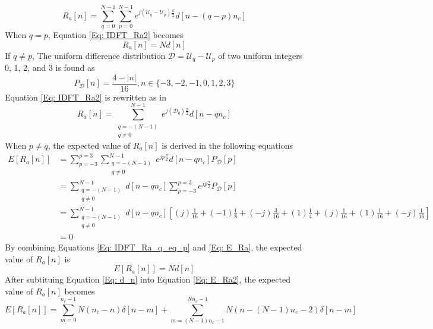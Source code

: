 \documentclass[draftcls,onecolumn]{IEEEtran}  %
\begin{document}
\begin{equation}\label{Eq: IDFT_Ra2}
R_a[n] = \sum\limits_{q=0}^{N-1} \sum\limits_{p=0}^{N-1} 
e^{j(\mathcal{U}_q-\mathcal{U}_p)\frac{\pi}{2}} d[n-(q-p)n_c]
\end{equation}
When $q = p$, Equation \ref{Eq: IDFT_Ra2} becomes
\begin{equation}\label{Eq: IDFT_Ra_q_eq_p}
R_a[n] = N d[n]
\end{equation}
If $q \neq p$, The uniform difference distribution $\mathcal{D} = \mathcal{U}_q-\mathcal{U}_p$ of two uniform integers 0, 1, 2, and 3 is found as 
\begin{equation}\label{Eq: diff_uni}
P_{\mathcal{D}}[n] = \frac{4-|n|}{16}, n \in \{ -3,-2,-1,0,1,2,3 \} 
\end{equation}
Equation \ref{Eq: IDFT_Ra2} is rewritten as in
\begin{equation}\label{Eq: IDFT_Ra3}
R_a[n] = \sum\limits_{\substack{q=-(N-1) \\ q\neq 0}}^{N-1} e^{j(\mathcal{D}_q)\frac{\pi}{2}} d[n-q n_c]
\end{equation}
When $p \neq q $, the expected value of $R_a[n]$ is derived in the following equations
\begin{equation}\label{Eq: E_Ra}
\begin{split}
E[R_a[n]] &= \sum\limits_{p=-3}^{p=3} \sum\limits_{\substack{q=-(N-1) \\ q\neq 0}}^{N-1}  e^{j p\frac{\pi}{2}} d[n-q n_c] P_{\mathcal{D}}[p] \\
          &= \sum\limits_{\substack{q=-(N-1) \\ q\neq 0}}^{N-1} d[n-q n_c]  \sum\limits_{p=-3}^{p=3} e^{j p\frac{\pi}{2}}  P_{\mathcal{D}}[p] \\
          &= \sum\limits_{\substack{q=-(N-1) \\ q\neq 0}}^{N-1} d[n-q n_c] [(j) \frac{1}{16} + (-1) \frac{1}{8} + (-j) \frac{3}{16} + (1) \frac{1}{4} + (j) \frac{1}{16} + (1) \frac{1}{16} + (-j) \frac{1}{16}] \\
          &= 0
\end{split}
\end{equation}
By combining Equations \ref{Eq: IDFT_Ra_q_eq_p} and \ref{Eq: E_Ra}, the expected value of $R_a[n]$ is
\begin{equation}\label{Eq: E_Ra2}
E[R_a[n]] = N d[n]
\end{equation}
After subtituing Equation \ref{Eq: d_n} into Equation \ref{Eq: E_Ra2}, the expected value of $R_a[n]$ becomes
\begin{equation}\label{Eq: E_Ra3}
E[R_a[n]] = \sum\limits_{m=0}^{n_c-1} N(n_c-n)\delta[n-m] + 
            \sum\limits_{m=(N-1)n_c-1}^{Nn_c-1} N(n-(N-1)n_c-2)\delta[n-m] 
\end{equation}
\end{document}
